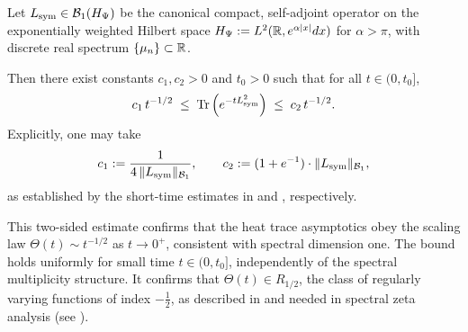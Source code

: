 \begin{proposition}
\label{prop:two_sided_heat_trace_bounds}
Let \( L_{\mathrm{sym}} \in \mathcal{B}_1(H_{\Psi}) \) be the canonical compact, self-adjoint operator on the exponentially weighted Hilbert space \( H_{\Psi} := L^2(\mathbb{R}, e^{\alpha|x|} dx) \) for \( \alpha > \pi \), with discrete real spectrum \( \{\mu_n\} \subset \mathbb{R} \).

Then there exist constants \( c_1, c_2 > 0 \) and \( t_0 > 0 \) such that for all \( t \in (0, t_0] \),
\[
c_1\, t^{-1/2}
\;\le\;
\operatorname{Tr}\left( e^{-t L_{\mathrm{sym}}^2} \right)
\;\le\;
c_2\, t^{-1/2}.
\]
Explicitly, one may take
\[
c_1 := \frac{1}{4 \, \| L_{\mathrm{sym}} \|_{\mathcal{B}_1}}, \qquad
c_2 := (1 + e^{-1}) \cdot \| L_{\mathrm{sym}} \|_{\mathcal{B}_1},
\]
as established by the short-time estimates in  and , respectively.

\medskip

\noindent
This two-sided estimate confirms that the heat trace asymptotics obey the scaling law \( \Theta(t) \sim t^{-1/2} \) as \( t \to 0^+ \), consistent with spectral dimension one. The bound holds uniformly for small time \( t \in (0, t_0] \), independently of the spectral multiplicity structure. It confirms that \( \Theta(t) \in R_{1/2} \), the class of regularly varying functions of index \( -\tfrac{1}{2} \), as described in  and needed in spectral zeta analysis (see ).
\end{proposition}
